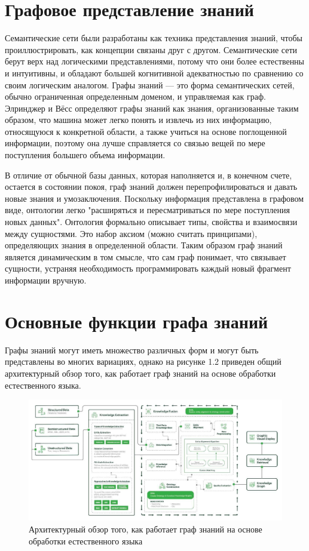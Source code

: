 \section{Графовое представление знаний}

Семантические сети были разработаны как техника представления знаний, чтобы проиллюстрировать, как концепции связаны друг с другом.
Семантические сети берут верх над логическими представлениями, потому что они более естественны и интуитивны, и обладают большей когнитивной
адекватностью по сравнению со своим логическим аналогом. Графы знаний — это форма семантических сетей, обычно ограниченная определенным
доменом, и управляемая как граф. Элринджер и Вёсс определяют графы знаний как знания, организованные таким образом, что машина может легко
понять и извлечь из них информацию, относящуюся к конкретной области, а также учиться на основе поглощенной информации, поэтому она лучше
справляется со связью вещей по мере поступления большего объема информации.

В отличие от обычной базы данных, которая наполняется и, в конечном счете, остается в состоянии покоя, граф знаний должен перепрофилироваться
и давать новые знания и умозаключения. Поскольку информация представлена в графовом виде, онтологии легко "расширяться и пересматриваться
по мере поступления новых данных". Онтология формально описывает типы, свойства и взаимосвязи между сущностями. Это набор аксиом (можно
считать принципами), определяющих знания в определенной области. Таким образом граф знаний является динамическим в том смысле, что сам граф
понимает, что связывает сущности, устраняя необходимость программировать каждый новый фрагмент информации вручную.


\section{Основные функции графа знаний}

Графы знаний могут иметь множество различных форм и могут быть представлены во многих вариациях, однако на рисунке 1.2 приведен общий
архитектурный обзор того, как работает граф знаний на основе обработки естественного языка.

\begin{figure}[ht!]
    \center
    \includegraphics [scale=0.32] {my_folder/myimg//2}
    \caption{Архитектурный обзор того, как работает граф знаний на основе обработки естественного языка}
\end{figure}

